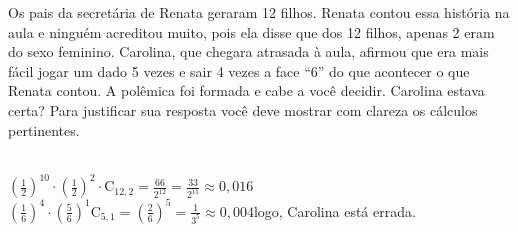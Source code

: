 \begin{ex}
 Os pais da secretária de Renata geraram 12 filhos. Renata contou essa história na aula e ninguém acreditou muito, pois ela disse que dos 12 filhos, apenas 2 eram do sexo feminino. Carolina, que chegara atrasada à aula, afirmou que era mais fácil jogar um dado 5 vezes e sair 4 vezes a face “6” do que acontecer o que Renata contou. A polêmica foi formada e cabe a você decidir. Carolina estava certa? Para justificar sua resposta você deve mostrar com clareza os cálculos pertinentes.
   \begin{sol}
    \phantom{A} \\
    $(\frac{1}{2})^{10}\cdot(\frac{1}{2})^2\cdot\mathrm{C}_{{12},2}=\frac{66}{2^{12}}=\frac{33}{2^{11}} \approx 0,016$ \\
    $(\frac{1}{6})^4\cdot(\frac{5}{6})^1\mathrm{C}_{5,1}=(\frac{2}{6})^5=\frac{1}{3^5}\approx0,004$\hspace{0,2cm}logo, Carolina está errada.
   \end{sol}
\end{ex}